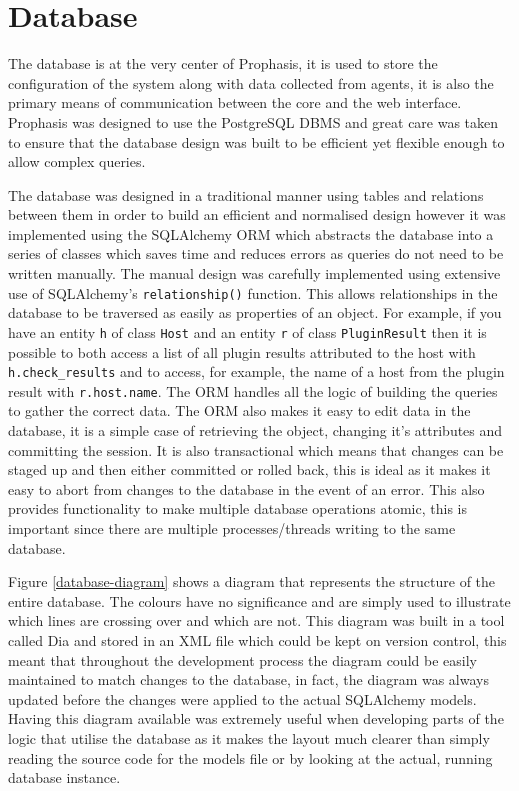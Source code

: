 \documentclass[bsc,deptreport,twoside,parskip,singlespacing,notimes]{infthesis}
\begin{document}
\section{Database}

	The database is at the very center of Prophasis, it is used to store the
	configuration of the system along with data collected from agents, it is also
	the primary means of communication between the core and the web interface.
	Prophasis was designed to use the PostgreSQL DBMS and great care was taken to
	ensure that the database design was built to be efficient yet flexible enough
	to allow complex queries.


	The database was designed in a traditional manner using tables and relations
	between them in order to build an efficient and normalised design however it
	was implemented using the SQLAlchemy ORM which abstracts the database into a
	series of classes which saves time and reduces errors as queries do not need
	to be written manually.  The manual design was carefully implemented using
	extensive use of SQLAlchemy's \texttt{relationship()} function.  This allows
	relationships in the database to be traversed as easily as properties of an
	object.  For example, if you have an entity \texttt{h} of class \texttt{Host}
	and an entity \texttt{r} of class \texttt{PluginResult} then it is possible
	to both access a list of all plugin results attributed to the host with
	\texttt{h.check\_results} and to access, for example, the name of a host
	from the plugin result with \texttt{r.host.name}.  The ORM handles all the
	logic of building the queries to gather the correct data.  The ORM also makes
	it easy to edit data in the database, it is a simple case of retrieving the
	object, changing it's attributes and committing the session.  It is also
	transactional which means that changes can be staged up and then either
	committed or rolled back, this is ideal as it makes it easy to abort from
	changes to the database in the event of an error.  This also provides
	functionality to make multiple database operations atomic, this is important
	since there are multiple processes/threads writing to the same database.


	Figure \ref{database-diagram} shows a diagram that represents the structure
	of the entire database.  The colours have no significance and are simply used
	to illustrate which lines are crossing over and which are not.
	This diagram was built in a tool called Dia and stored
	in an XML file which could be kept on version control, this meant that
	throughout the development process the diagram could be easily maintained to
	match changes to the database, in fact, the diagram was always updated before
	the changes were applied to the actual SQLAlchemy models. Having this diagram
	available was extremely useful when developing parts of the logic that utilise
	the database as it makes the layout much clearer than simply reading the source
	code for the models file or by looking at the actual, running database
	instance.
\end{document}
